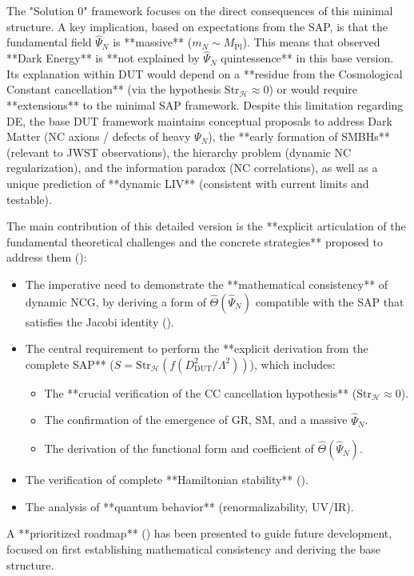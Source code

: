 \documentclass[11pt, a4paper]{article}
\theoremstyle{remark}
\newcommand{\Op}[1]{\hat{#1}}
\newcommand{\Str}{\mathrm{Str}}
\newcommand{\Mpl}{M_{\mathrm{Pl}}}
\begin{document}
The "Solution 0" framework focuses on the direct consequences of this minimal structure. A key implication, based on expectations from the SAP, is that the fundamental field \( \Op{\Psi}_N \) is **massive** (\(m_N \sim \Mpl\)). This means that observed **Dark Energy** is **not explained by \( \Op{\Psi}_N \) quintessence** in this base version. Its explanation within DUT would depend on a **residue from the Cosmological Constant cancellation** (via the hypothesis \( \Str_{\mathcal{H}} \approx 0 \)) or would require **extensions** to the minimal SAP framework. Despite this limitation regarding DE, the base DUT framework maintains conceptual proposals to address Dark Matter (NC axions / defects of heavy \( \Psi_N \)), the **early formation of SMBHs** (relevant to JWST observations), the hierarchy problem (dynamic NC regularization), and the information paradox (NC correlations), as well as a unique prediction of **dynamic LIV** (consistent with current limits and testable).

The main contribution of this detailed version is the **explicit articulation of the fundamental theoretical challenges and the concrete strategies** proposed to address them ():
\begin{itemize}
    \item The imperative need to demonstrate the **mathematical consistency** of dynamic NCG, by deriving a form of \( \Op{\Theta}(\Op{\Psi}_N) \) compatible with the SAP that satisfies the Jacobi identity ().
    \item The central requirement to perform the **explicit derivation from the complete SAP** (\( S = \Str_{\mathcal{H}}(f(D_{\text{DUT}}^2/\Lambda^2)) \)), which includes:
        \begin{itemize}
            \item The **crucial verification of the CC cancellation hypothesis** (\( \Str_{\mathcal{H}} \approx 0 \)).
            \item The confirmation of the emergence of GR, SM, and a massive \( \Op{\Psi}_N \).
            \item The derivation of the functional form and coefficient of \( \Op{\Theta}(\Op{\Psi}_N) \).
        \end{itemize}
    \item The verification of complete **Hamiltonian stability** ().
    \item The analysis of **quantum behavior** (renormalizability, UV/IR).
\end{itemize}
A **prioritized roadmap** () has been presented to guide future development, focused on first establishing mathematical consistency and deriving the base structure.
\end{document}
